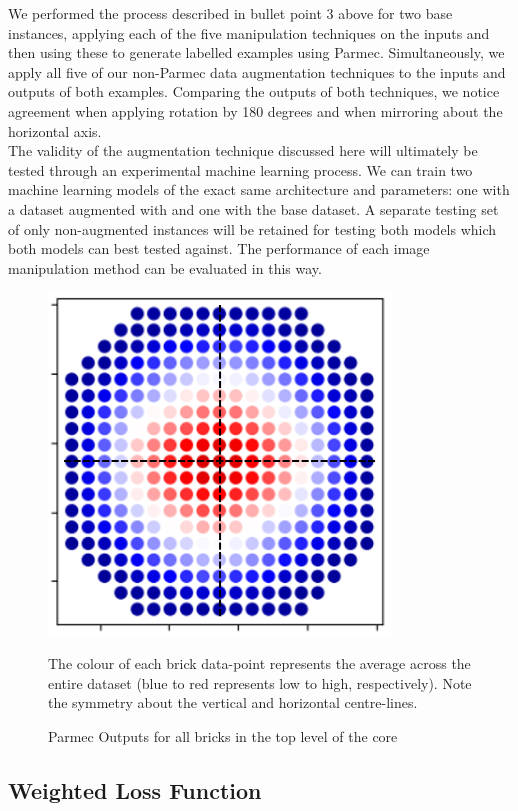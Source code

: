 \noindent
We performed the process described in bullet point 3 above for two base instances, applying each of the five manipulation techniques on the inputs and then using these to generate labelled examples using Parmec. Simultaneously, we apply all five of our non-Parmec data augmentation techniques to the inputs and outputs of both examples. Comparing the outputs of both techniques, we notice agreement when applying rotation by 180 degrees and when mirroring about the horizontal axis. 
\\

\noindent
The validity of the augmentation technique discussed here will ultimately be tested through an experimental machine learning process. We can train two machine learning models of the exact same architecture and parameters: one with a dataset augmented with and one with the base dataset. A separate testing set of only non-augmented instances will be retained for testing both models which both models can best tested against. The performance of each image manipulation method can be evaluated in this way. 


\begin{figure}[h]
	\centering
	\includegraphics[scale=0.8]{Figures/compositeLines.png}
	\caption{Parmec Outputs for all bricks in the top level of the core} {The colour of each brick data-point represents the average across the entire dataset (blue to red represents low to high, respectively). Note the symmetry about the vertical and horizontal centre-lines. }
	\label{fig:composite}
\end{figure}



\subsection{Weighted Loss Function} \label{Weighted}

